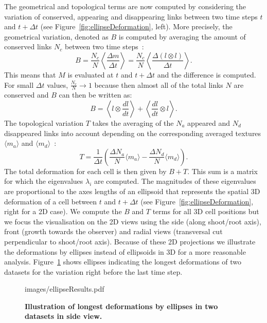 \documentclass[11pt,a4paper, final]{article}
\begin{document}
\noindent
The geometrical and topological terms are now computed by considering the variation of conserved, appearing and disappearing links between two time steps $t$ and $t + \Delta t$ (see Figure~\ref{fig:ellipseDeformation}, left). More precisely, the geometrical variation, denoted as $B$ is computed by averaging the amount of conserved links $N_c$ between two time steps~\cite{graner_et_al_2008}:
\begin{equation}
B = \frac{N_c}{N} \left\langle \frac{\Delta m}{\Delta t} \right\rangle = \frac{N_c}{N} \left\langle \frac{\Delta (l \otimes l) }{\Delta t} \right\rangle.
\end{equation}
This means that $M$ is evaluated at $t$ and $t + \Delta t$ and the difference is computed. For small $\Delta t$ values, $\frac{N_c}{N} \rightarrow 1$ because then almost all of the total links $N$ are conserved and $B$ can then be written as:
\begin{equation}
B = \left\langle l \otimes \frac{dl}{dt} \right\rangle + \left\langle \frac{dl}{dt} \otimes l \right\rangle.
\end{equation}
The topological variation $T$ takes the averaging of the $N_a$ appeared and $N_d$ disappeared links into account depending on the corresponding averaged textures $\langle m_a \rangle$ and $\langle m_d \rangle$~\cite{graner_et_al_2008}:
\begin{equation}
T = \frac{1}{\Delta t} \left( \frac{\Delta N_a}{N} \langle m_a \rangle - \frac{\Delta N_d}{N} \langle m_d \rangle \right).
\end{equation}
The total deformation for each cell is then given by $B+T$. This sum is a matrix for which the eigenvalues $\lambda_i$ are computed. The magnitudes of these eigenvalues are proportional to the axes lengths of an ellipsoid that represents the spatial 3D deformation of a cell between $t$ and $t + \Delta t$ (see Figure~\ref{fig:ellipseDeformation}, right for a 2D case). We compute the $B$ and $T$ terms for all 3D cell positions but we focus the visualisation on the 2D views using the side (along shoot/root axis), front (growth towards the observer) and radial views (transversal cut perpendicular to shoot/root axis). Because of these 2D projections we illustrate the deformations by ellipses instead of ellipsoids in 3D for a more reasonable analysis. Figure~\ref{fig:ellipseResults} shows ellipses indicating the longest deformations of two datasets for the variation right before the last time step.
%
\begin{figure}[htbp]
	\begin{center}
		\begin{overpic}[width=1.\linewidth]{images/ellipseResults.pdf}
		\end{overpic}
\caption[Illustration of longest deformations by ellipses in two datasets in side view.]
{
{\bf Illustration of longest deformations by ellipses in two datasets in side view.}
}
	\label{fig:ellipseResults}
	\end{center}
\end{figure}
%
\end{document}
